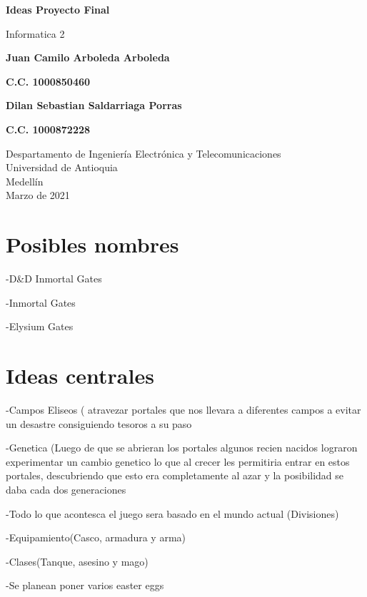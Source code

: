 \documentclass{article}
\begin{document}
\begin{titlepage}
    \begin{center}
        \vspace*{1cm}
            
        \Huge
        \textbf{Ideas Proyecto Final}
            
        \vspace{0.5cm}
        \LARGE
        Informatica 2
            
        \vspace{1.5cm}
            
        
        \textbf{Juan Camilo Arboleda Arboleda}
        
        \vspace{0.5cm}
            
        \textbf{C.C. 1000850460}
        
        \textbf{Dilan Sebastian Saldarriaga Porras}
        
        \vspace{0.5cm}
            
        \textbf{C.C. 1000872228}
            
        \vfill
            
        \vspace{0.8cm}
            
        \Large
        Despartamento de Ingeniería Electrónica y Telecomunicaciones\\
        Universidad de Antioquia\\
        Medellín\\
        Marzo de 2021
            
    \end{center}
\end{titlepage}

\tableofcontents
\newpage
\section{Posibles nombres}\label{intro}
-D&D Inmortal Gates

-Inmortal Gates

-Elysium Gates

\section{Ideas centrales}\label{intro}
-Campos Eliseos ( atravezar portales que nos llevara a diferentes campos a evitar un desastre consiguiendo tesoros a su paso

-Genetica (Luego de que se abrieran los portales algunos recien nacidos lograron experimentar un cambio genetico lo que al crecer les permitiria entrar en estos portales, descubriendo que esto era completamente al azar y la posibilidad se daba cada dos generaciones

-Todo lo que acontesca el juego sera basado en el mundo actual (Divisiones)

-Equipamiento(Casco, armadura y arma)

-Clases(Tanque, asesino y mago)

-Se planean poner varios easter eggs
\end{document}
